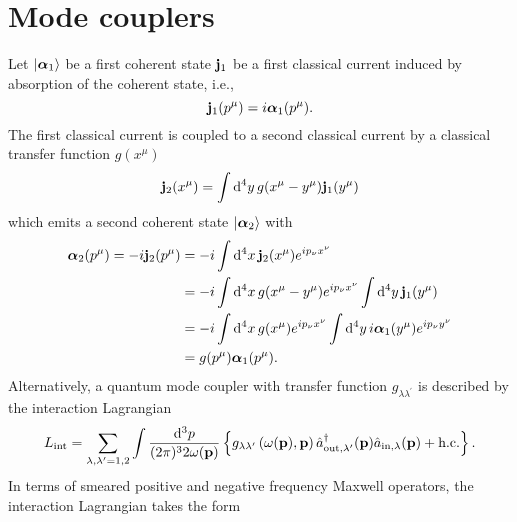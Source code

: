 \section{Mode couplers}

Let $\ket{\boldsymbol{\alpha}_1}$ be a first coherent state $\vb{j}_1$ be a first classical current induced by absorption of the coherent state, i.e.,
\begin{equation*}
	\vb{j}_1(p^\mu)
	=
	i\boldsymbol{\alpha}_1(p^\mu)
	.
\end{equation*}
The first classical current is coupled to a second classical current by a classical transfer function $g(x^\mu)$
\begin{equation*}
	\vb{j}_2(x^\mu)
	=
	\int\dd[4]{y}
	g(x^\mu-y^\mu)
	\vb{j}_1(y^\mu)
\end{equation*}
which emits a second coherent state $\ket{\boldsymbol{\alpha}_2}$ with
\begin{equation*}
	\begin{split}
		\boldsymbol{\alpha}_2(p^\mu)
		=
		-i\vb{j}_2(p^\mu)
		&=
		-i
		\int\dd[4]{x}
		\vb{j}_2(x^\mu)
		e^{ip_\nu x^\nu}
		\\
		&=
		-i
		\int\dd[4]{x}
		g(x^\mu-y^\mu)
		e^{ip_\nu x^\nu}
		\int\dd[4]{y}
		\vb{j}_1(y^\mu)
		\\
		&=
		-i
		\int\dd[4]{x}
		g(x^\mu)
		e^{ip_\nu x^\nu}
		\int\dd[4]{y}
		i\boldsymbol{\alpha}_1(y^\mu)
		e^{ip_\nu y^\nu}
		\\
		&=
		g(p^\mu)
		\boldsymbol{\alpha}_1(p^\mu)
		.
	\end{split}
\end{equation*}
Alternatively, a quantum mode coupler with transfer function $g_{\lambda\lambda^\prime}$ is described by the interaction Lagrangian
\begin{equation}
	L_\text{int}
	=
	\sum_{\lambda,\lambda^\prime=1,2}
	\int\frac{\dd[3]{p}}{(2\pi)^32\omega(\vb{p})}
	\left\{
		g_{\lambda\lambda^\prime}\left(\omega(\vb{p}),\vb{p}\right)
		\hat{a}_{\text{out},\lambda^\prime}^\dagger(\vb{p})
		\hat{a}_{\text{in},\lambda}(\vb{p})
		+
		\text{h.c.}
	\right\}
	.
\end{equation}
In terms of smeared positive and negative frequency Maxwell operators, the interaction Lagrangian takes the form
